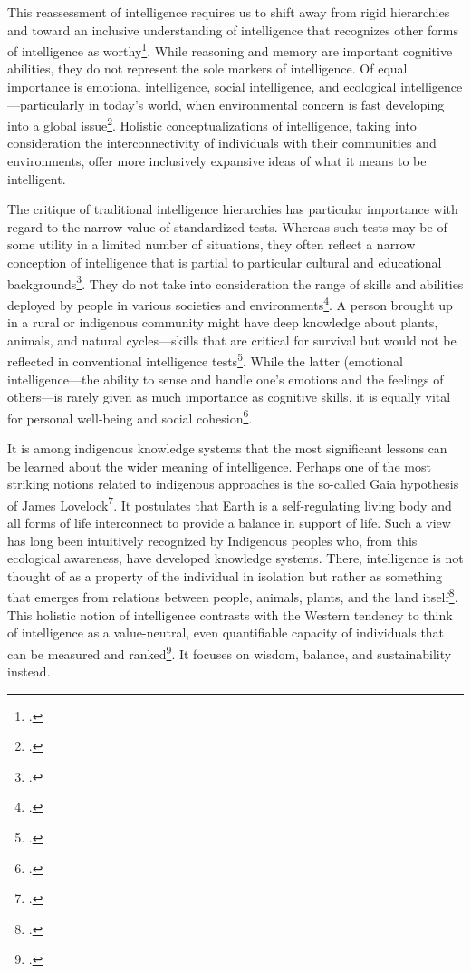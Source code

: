 \documentclass[12pt]{article}
\begin{document}
This reassessment of intelligence requires us to shift away from rigid hierarchies and toward an inclusive understanding of intelligence that recognizes other forms of intelligence as worthy\footcite{goleman1995emotional}. While reasoning and memory are important cognitive abilities, they do not represent the sole markers of intelligence. Of equal importance is emotional intelligence, social intelligence, and ecological intelligence—particularly in today's world, when environmental concern is fast developing into a global issue\footcite{lovelock2000gaia}. Holistic conceptualizations of intelligence, taking into consideration the interconnectivity of individuals with their communities and environments, offer more inclusively expansive ideas of what it means to be intelligent.

The critique of traditional intelligence hierarchies has particular importance with regard to the narrow value of standardized tests. Whereas such tests may be of some utility in a limited number of situations, they often reflect a narrow conception of intelligence that is partial to particular cultural and educational backgrounds\footcite{sternberg2004wisdom}. They do not take into consideration the range of skills and abilities deployed by people in various societies and environments\footcite{gardner1999intelligence}. A person brought up in a rural or indigenous community might have deep knowledge about plants, animals, and natural cycles—skills that are critical for survival but would not be reflected in conventional intelligence tests\footcite{berkes2012sacred}. While the latter (emotional intelligence—the ability to sense and handle one's emotions and the feelings of others—is rarely given as much importance as cognitive skills, it is equally vital for personal well-being and social cohesion\footcite{goleman1995emotional}.

It is among indigenous knowledge systems that the most significant lessons can be learned about the wider meaning of intelligence. Perhaps one of the most striking notions related to indigenous approaches is the so-called Gaia hypothesis of James Lovelock\footcite{lovelock2000gaia}. It postulates that Earth is a self-regulating living body and all forms of life interconnect to provide a balance in support of life. Such a view has long been intuitively recognized by Indigenous peoples who, from this ecological awareness, have developed knowledge systems. There, intelligence is not thought of as a property of the individual in isolation but rather as something that emerges from relations between people, animals, plants, and the land itself\footcite{lovelock2000gaia}. This holistic notion of intelligence contrasts with the Western tendency to think of intelligence as a value-neutral, even quantifiable capacity of individuals that can be measured and ranked\footcite{sternberg2004wisdom}. It focuses on wisdom, balance, and sustainability instead.
\end{document}
